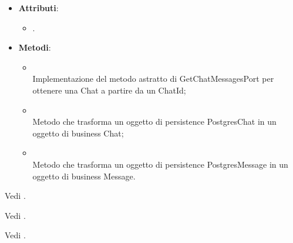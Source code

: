 \documentclass[10pt, a4paper]{article}
\begin{document}
\label{GetChatMessagesPostgresDettaglio}
\begin{itemize}
    \item \textbf{Attributi}:
    \begin{itemize}
        \item {}.
    \end{itemize}
    \item \textbf{Metodi}:
    \begin{itemize}
        \item {}\\
        Implementazione del metodo astratto di GetChatMessagesPort per ottenere una Chat a partire da un ChatId;
        \item {}\\
        Metodo che trasforma un oggetto di persistence PostgresChat in un oggetto di business Chat;
        \item {}\\
        Metodo che trasforma un oggetto di persistence PostgresMessage in un oggetto di business Message.
    \end{itemize}
\end{itemize}

Vedi .

Vedi .

Vedi .
\end{document}
